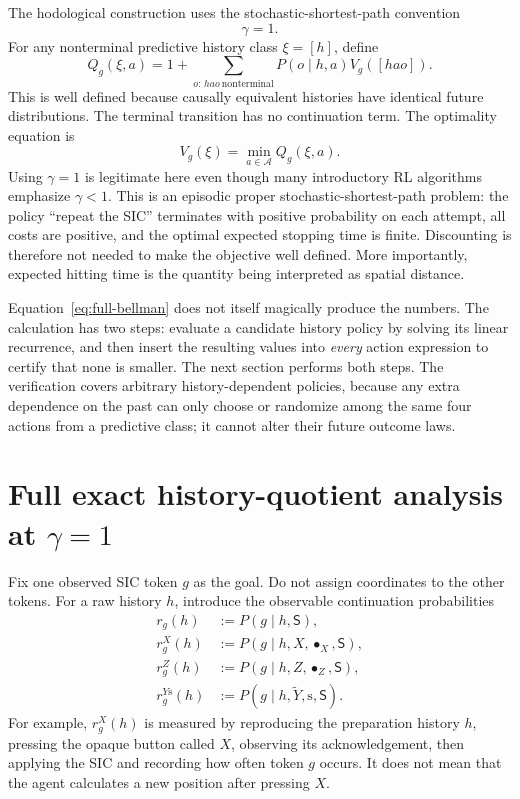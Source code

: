 \documentclass[11pt]{article}
\theoremstyle{definition}
\theoremstyle{remark}
\begin{document}
The hodological construction uses the stochastic-shortest-path convention
\begin{equation}
 \boxed{\gamma=1.}
 \label{eq:gamma-one}
\end{equation}
For any nonterminal predictive history class \(\xi=[h]\), define
\begin{equation}
 Q_g(\xi,a)=1+\sum_{o:\,hao\ \mathrm{nonterminal}}
 P(o\mid h,a)V_g([hao]).
 \label{eq:undiscounted-q}
\end{equation}
This is well defined because causally equivalent histories have identical
future distributions. The terminal transition has no continuation term. The
optimality equation is
\begin{equation}
 \boxed{V_g(\xi)=\min_{a\in\mathcal A}Q_g(\xi,a).}
 \label{eq:full-bellman}
\end{equation}
Using \(\gamma=1\) is legitimate here even though many introductory RL
algorithms emphasize \(\gamma<1\). This is an episodic proper
stochastic-shortest-path problem: the policy ``repeat the SIC'' terminates
with positive probability on each attempt, all costs are positive, and the
optimal expected stopping time is finite. Discounting is therefore not
needed to make the objective well defined. More importantly, expected
hitting time is the quantity being interpreted as spatial distance.

Equation~\eqref{eq:full-bellman} does not itself magically produce the
numbers.  The calculation has two steps: evaluate a candidate history policy
by solving its linear recurrence, and then insert the resulting values into
\emph{every} action expression to certify that none is smaller.  The next
section performs both steps.  The verification covers arbitrary
history-dependent policies, because any extra dependence on the past can only
choose or randomize among the same four actions from a predictive class; it
cannot alter their future outcome laws.

\section{Full exact history-quotient analysis at
\texorpdfstring{\(\gamma=1\)}{gamma=1}}
\label{sec:full-action-analysis}

Fix one observed SIC token \(g\) as the goal.  Do not assign coordinates to the
other tokens.  For a raw history \(h\), introduce the observable continuation
probabilities
\begin{align*}
 r_g(h)&:=P(g\mid h,\mathsf S),\\
 r_g^X(h)&:=P(g\mid h,X,\bullet_X,\mathsf S),\\
 r_g^Z(h)&:=P(g\mid h,Z,\bullet_Z,\mathsf S),\\
 r_g^{Y\mathrm s}(h)&:=P(g\mid h,\widetilde Y,
              \mathrm s,\mathsf S).
\end{align*}
For example, \(r_g^X(h)\) is measured by reproducing the preparation history
\(h\), pressing the opaque button called \(X\), observing its acknowledgement,
then applying the SIC and recording how often token \(g\) occurs.  It does not
mean that the agent calculates a new position after pressing \(X\).
\end{document}
